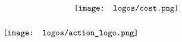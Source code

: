\thispagestyle{empty}
\begin{center}
\begin{minipage}{0.75\linewidth}
    \centering
        \vspace{3cm}
\centering
\begin{align*}
&\hspace{3cm}\texttt{[image: logos/cost.png]}
\\
\vspace{5cm}
\\
&\texttt{[image: logos/action\_logo.png]}
\end{align*}
\vfill
\end{minipage}
\begin{minipage}{0.75\linewidth}
\maketitle
\end{minipage}
\end{center}
